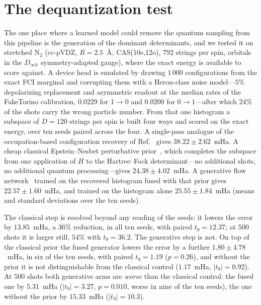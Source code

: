 \section{The dequantization test}
\label{sec:scope:dequant}\label{app:dequant}
The one place where a learned model could remove the quantum sampling from this pipeline is the
generation of the dominant determinants, and we tested it on stretched $\mathrm{N_2}$ (cc-pVDZ,
$R=2.5$~\AA, CAS(10e,12o), $792$ strings per spin, orbitals in the $D_{\infty h}$ symmetry-adapted
gauge), where the exact energy is available to score against. A device head is emulated by drawing
$1\,000$ configurations from the exact FCI marginal and corrupting them with a Heron-class noise
model---$5\%$ depolarizing replacement and asymmetric readout at the median rates of the
FakeTorino calibration, $0.0229$ for $1\to0$ and $0.0200$ for $0\to1$---after which
$24\%$ of the shots carry the wrong particle number. From that one histogram a subspace of
$D=120$ strings per spin is built four ways and scored on the exact energy, over ten seeds paired
across the four. A single-pass analogue of the occupation-based configuration recovery of
Ref.~\cite{robledomoreno2025} gives $38.22\pm2.62$~mHa. A cheap classical Epstein--Nesbet perturbative
prior~\cite{cipsi1973}, which completes the subspace from one application of $H$ to the Hartree--Fock
determinant---no additional shots, no additional quantum processing---gives $24.38\pm4.02$~mHa. A generative
flow network~\cite{bengio2021} trained on the recovered histogram fused with that prior gives
$22.57\pm1.60$~mHa, and trained on the histogram alone $25.55\pm1.84$~mHa (means and standard deviations over the
ten seeds).

The classical step is resolved beyond any reading of the seeds: it lowers the error by
$13.85$~mHa, a $36\%$ reduction, in all ten seeds, with paired $t_9=12.37$; at $500$
shots it is larger still, $54\%$ with $t_9=36.2$. The generative step is not. On top
of the classical prior the fused generator lowers the error by a further $1.80\pm4.78$~mHa,
in six of the ten seeds, with paired $t_9=1.19$ ($p=0.26$), and without the prior it is
not distinguishable from the classical control ($1.17$~mHa, $\lvert t_9\rvert=0.92$). At
$500$ shots both generative arms are \emph{worse} than the classical control: the fused one by
$5.31$~mHa ($\lvert t_9\rvert=3.27$, $p=0.010$, worse in nine of the ten seeds),
the one without the prior by $15.33$~mHa ($\lvert t_9\rvert=10.3$).

